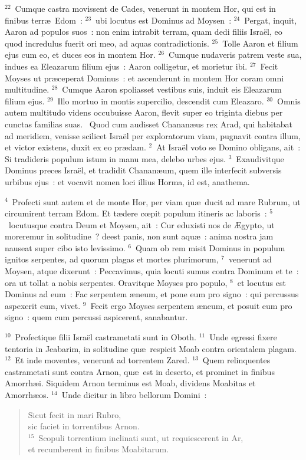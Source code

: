 ${}^{22}$~Cumque castra movissent de Cades, venerunt in montem Hor, qui est in finibus terr\ae\ Edom~:
${}^{23}$~ubi locutus est Dominus ad Moysen~:
${}^{24}$~Pergat, inquit, Aaron ad populos suos~: non enim intrabit terram, quam dedi filiis Isra\"el, eo quod incredulus fuerit ori meo, ad aquas contradictionis.
${}^{25}$~Tolle Aaron et filium ejus cum eo, et duces eos in montem Hor.
${}^{26}$~Cumque nudaveris patrem veste sua, indues ea Eleazarum filium ejus~: Aaron colligetur, et morietur ibi.
${}^{27}$~Fecit Moyses ut pr\ae ceperat Dominus~: et ascenderunt in montem Hor coram omni multitudine.
${}^{28}$~Cumque Aaron spoliasset vestibus suis, induit eis Eleazarum filium ejus.
${}^{29}$~Illo mortuo in montis supercilio, descendit cum Eleazaro.
${}^{30}$~Omnis autem multitudo videns occubuisse Aaron, flevit super eo triginta diebus per cunctas familias suas.
~Quod cum audisset Chanan\ae us rex Arad, qui habitabat ad meridiem, venisse scilicet Isra\"el per exploratorum viam, pugnavit contra illum, et victor existens, duxit ex eo pr\ae dam.
${}^{2}$~At Isra\"el voto se Domino obligans, ait~: Si tradideris populum istum in manu mea, delebo urbes ejus.
${}^{3}$~Exaudivitque Dominus preces Isra\"el, et tradidit Chanan\ae um, quem ille interfecit subversis urbibus ejus~: et vocavit nomen loci illius Horma, id est, anathema.


${}^{4}$~Profecti sunt autem et de monte Hor, per viam qu\ae\ ducit ad mare Rubrum, ut circumirent terram Edom. Et t\ae dere cœpit populum itineris ac laboris~:
${}^{5}$~locutusque contra Deum et Moysen, ait~: Cur eduxisti nos de \AE gypto, ut moreremur in solitudine~? deest panis, non sunt aqu\ae~: anima nostra jam nauseat super cibo isto levissimo.
${}^{6}$~Quam ob rem misit Dominus in populum ignitos serpentes, ad quorum plagas et mortes plurimorum,
${}^{7}$~venerunt ad Moysen, atque dixerunt~: Peccavimus, quia locuti sumus contra Dominum et te~: ora ut tollat a nobis serpentes. Oravitque Moyses pro populo,
${}^{8}$~et locutus est Dominus ad eum~: Fac serpentem \ae neum, et pone eum pro signo~: qui percussus aspexerit eum, vivet.
${}^{9}$~Fecit ergo Moyses serpentem \ae neum, et posuit eum pro signo~: quem cum percussi aspicerent, sanabantur.


${}^{10}$~Profectique filii Isra\"el castrametati sunt in Oboth.
${}^{11}$~Unde egressi fixere tentoria in Jeabarim, in solitudine qu\ae\ respicit Moab contra orientalem plagam.
${}^{12}$~Et inde moventes, venerunt ad torrentem Zared.
${}^{13}$~Quem relinquentes castrametati sunt contra Arnon, qu\ae\ est in deserto, et prominet in finibus Amorrh\ae i. Siquidem Arnon terminus est Moab, dividens Moabitas et Amorrh\ae os.
${}^{14}$~Unde dicitur in libro bellorum Domini~: \begin{flushleft}\begin{verse}Sicut fecit in mari Rubro,\\ sic faciet in torrentibus Arnon.\\
${}^{15}$~Scopuli torrentium inclinati sunt, ut requiescerent in Ar,\\ et recumberent in finibus Moabitarum.\end{verse}\end{flushleft}


